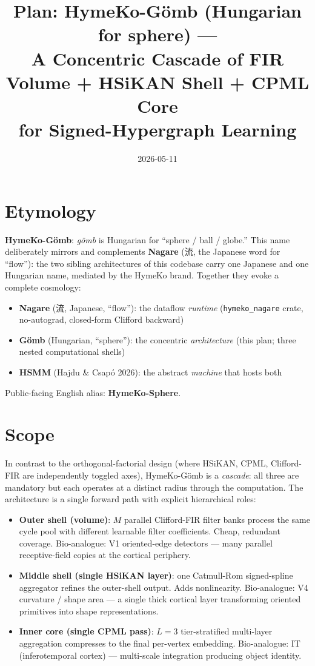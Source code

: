 \documentclass[11pt]{article}
\title{Plan: \textbf{HymeKo-Gömb} (Hungarian for sphere) ---\\
  A Concentric Cascade of FIR Volume + HSiKAN Shell + CPML Core\\
  for Signed-Hypergraph Learning}
\author{}
\date{2026-05-11}
\begin{document}
\maketitle

\section*{Etymology}

\textbf{HymeKo-Gömb}: \emph{gömb} is Hungarian for ``sphere / ball
/ globe.'' This name deliberately mirrors and complements
\textbf{Nagare} (流, the Japanese word for ``flow''): the two
sibling architectures of this codebase carry one Japanese and one
Hungarian name, mediated by the HymeKo brand. Together they evoke
a complete cosmology:
\begin{itemize}
  \item \textbf{Nagare} (流, Japanese, ``flow''): the dataflow
    \emph{runtime} (\texttt{hymeko\_nagare} crate, no-autograd,
    closed-form Clifford backward)
  \item \textbf{Gömb} (Hungarian, ``sphere''): the concentric
    \emph{architecture} (this plan; three nested computational shells)
  \item \textbf{HSMM} (Hajdu \& Csapó 2026): the abstract
    \emph{machine} that hosts both
\end{itemize}

Public-facing English alias: \textbf{HymeKo-Sphere}.

\section{Scope}

In contrast to the orthogonal-factorial design (where HSiKAN, CPML,
Clifford-FIR are independently toggled axes), HymeKo-Gömb is a
\emph{cascade}: all three are mandatory but each operates at a
distinct radius through the computation. The architecture is a
single forward path with explicit hierarchical roles:

\begin{itemize}
  \item \textbf{Outer shell (volume)}: $M$ parallel Clifford-FIR
    filter banks process the same cycle pool with different
    learnable filter coefficients. Cheap, redundant coverage.
    Bio-analogue: V1 oriented-edge detectors --- many parallel
    receptive-field copies at the cortical periphery.
  \item \textbf{Middle shell (single HSiKAN layer)}: one Catmull-Rom
    signed-spline aggregator refines the outer-shell output.
    Adds nonlinearity. Bio-analogue: V4 curvature / shape area
    --- a single thick cortical layer transforming oriented
    primitives into shape representations.
  \item \textbf{Inner core (single CPML pass)}: $L=3$ tier-stratified
    multi-layer aggregation compresses to the final per-vertex
    embedding. Bio-analogue: IT (inferotemporal cortex) ---
    multi-scale integration producing object identity.
\end{itemize}
\end{document}

